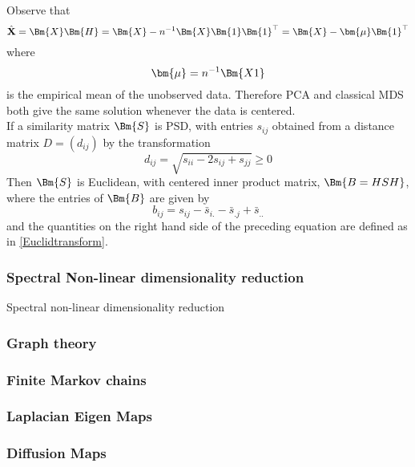 Observe that 
\[ \hat{\textbf{X}} = \Bm{X}\Bm{H} = \Bm{X} - n^{-1} \Bm{X}\Bm{1}\Bm{1}^{\top} = \Bm{X} - \bm{\mu}\Bm{1}^{\top}
\]
where 
\[
\bm{\mu} = n^{-1} \Bm{X1}
\]
is the empirical mean of the unobserved data. Therefore PCA and classical MDS both give the same solution whenever the data is centered.\\

If a similarity matrix $\Bm{S}$ is PSD, with entries 
$s_{ij}$ obtained from a distance matrix $D = (d_{ij})$ by the transformation
\[ 
d_{ij} = \sqrt{s_{ii} - 2s_{ij} + s_{jj}} \geq 0
\]
Then $\Bm{S}$ is Euclidean, with centered inner product matrix, $\Bm{B = HSH}$, where the entries of $\Bm{B}$ are given by 
\[ 
b_{ij} = s_{ij} - \bar{s}_{i.} - \bar{s}_{.j} + \bar{s}_{..}
\]
and the quantities on the right hand side of the preceding equation are defined as in \eqref{Euclidtransform}.

\subsubsection{Spectral Non-linear dimensionality reduction}
Spectral non-linear dimensionality reduction


\subsubsection{Graph theory}

 
\subsubsection{Finite Markov chains}


\subsubsection{Laplacian Eigen Maps}


\subsubsection{Diffusion Maps}



